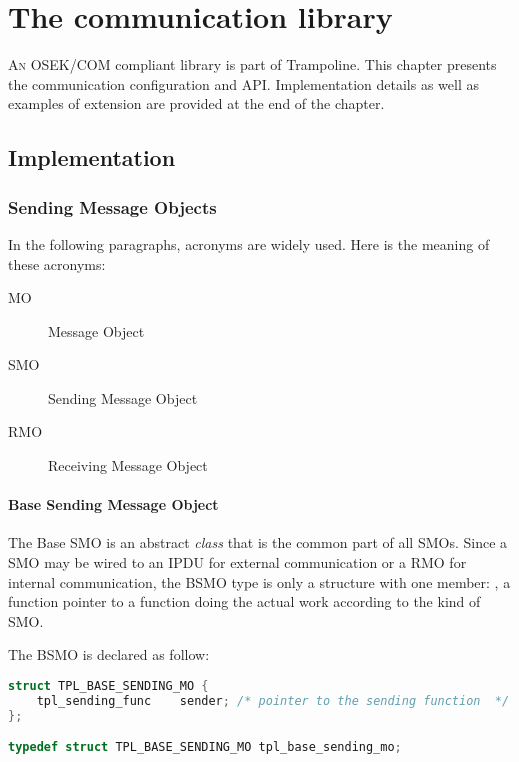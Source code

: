 
\chapter{The communication library}

\lettrine{A}n OSEK/COM compliant library is part of Trampoline.
This chapter presents the communication configuration and API.
Implementation details as well as examples of extension are provided at the end of the chapter.

\section{Implementation}


\subsection{Sending Message Objects}

In the following paragraphs, acronyms are widely used. Here is the meaning of these acronyms:
\begin{description}
\item [MO] Message Object
\item [SMO] Sending Message Object
\item [RMO] Receiving Message Object
\end{description}

\subsubsection{Base Sending Message Object}

The Base SMO is an abstract {\em class} that is the common part of all SMOs.
Since a SMO may be wired to an IPDU for external communication or a RMO for internal communication, the BSMO type is only a structure with one member: , a function pointer to a function doing the actual work according to the kind of SMO. 


The BSMO is declared as follow:

\begin{lstlisting}[language=C]
struct TPL_BASE_SENDING_MO {
    tpl_sending_func    sender; /* pointer to the sending function  */
};

typedef struct TPL_BASE_SENDING_MO tpl_base_sending_mo;
\end{lstlisting}


